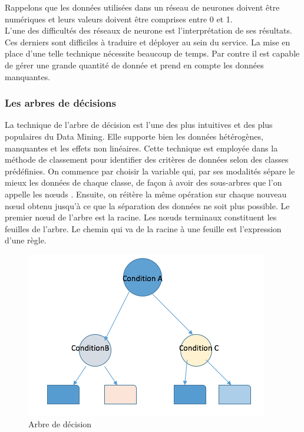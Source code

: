 \documentclass[11pt,a4paper]{report}
\begin{document}
Rappelons que les données utilisées dans un réseau de neurones doivent être numériques et leurs valeurs doivent être comprises entre 0 et 1. \\

L'une des difficultés des réseaux de neurone est l'interprétation de ses résultats. Ces derniers sont difficiles à traduire et déployer au sein du service. La mise en place d'une telle technique nécessite beaucoup de temps. Par contre il est capable de gérer une grande quantité de donnée et prend en compte les données manquantes.

\newpage
\subsubsection{Les arbres de décisions}
La technique de l'arbre de décision est l'une des plus intuitives et des plus populaires du Data Mining. Elle supporte bien les données hétérogènes, manquantes et les effets non linéaires. Cette technique est employée dans la méthode de classement pour identifier des critères de données selon des classes prédéfinies. On commence par choisir la variable qui, par ses modalités sépare le mieux les données de chaque classe, de façon à avoir des sous-arbres que l'on appelle les nœuds \cite{stephane}. Ensuite, on réitère la même opération sur chaque nouveau nœud obtenu jusqu'à ce que la séparation des données ne soit plus possible. Le premier nœud de l'arbre est la racine. Les nœuds terminaux constituent les feuilles de l'arbre. Le chemin qui va de la racine à une feuille est l'expression d'une règle.
 \begin{figure}[h]
   \centering
   \includegraphics[scale=0.80]{arbre.png}
     \caption{Arbre de décision}
\end{figure}
\end{document}
